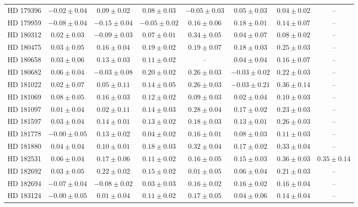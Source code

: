 \begin{table*}
\begin{tabular}{cccccccc}
HD 179396 & $-0.02 \pm 0.04$ & $0.09 \pm 0.02$ & $0.08 \pm 0.03$ & $-0.05 \pm 0.03$ & $0.05 \pm 0.03$ & $0.04 \pm 0.02$ & -- \\
HD 179959 & $-0.08 \pm 0.04$ & $-0.15 \pm 0.04$ & $-0.05 \pm 0.02$ & $0.16 \pm 0.06$ & $0.18 \pm 0.01$ & $0.14 \pm 0.07$ & -- \\
HD 180312 & $0.02 \pm 0.03$ & $-0.09 \pm 0.03$ & $0.07 \pm 0.01$ & $0.34 \pm 0.05$ & $0.04 \pm 0.07$ & $0.08 \pm 0.02$ & -- \\
HD 180475 & $0.03 \pm 0.05$ & $0.16 \pm 0.04$ & $0.19 \pm 0.02$ & $0.19 \pm 0.07$ & $0.18 \pm 0.03$ & $0.25 \pm 0.03$ & -- \\
HD 180658 & $0.03 \pm 0.06$ & $0.13 \pm 0.03$ & $0.11 \pm 0.02$ & -- & $0.04 \pm 0.04$ & $0.16 \pm 0.07$ & -- \\
HD 180682 & $0.06 \pm 0.04$ & $-0.03 \pm 0.08$ & $0.20 \pm 0.02$ & $0.26 \pm 0.03$ & $-0.03 \pm 0.02$ & $0.22 \pm 0.03$ & -- \\
HD 181022 & $0.02 \pm 0.07$ & $0.05 \pm 0.11$ & $0.14 \pm 0.05$ & $0.26 \pm 0.03$ & $-0.03 \pm 0.21$ & $0.36 \pm 0.14$ & -- \\
HD 181069 & $0.08 \pm 0.05$ & $0.16 \pm 0.03$ & $0.12 \pm 0.02$ & $0.09 \pm 0.03$ & $0.02 \pm 0.04$ & $0.10 \pm 0.03$ & -- \\
HD 181097 & $0.01 \pm 0.04$ & $0.02 \pm 0.11$ & $0.14 \pm 0.03$ & $0.28 \pm 0.04$ & $0.17 \pm 0.02$ & $0.23 \pm 0.03$ & -- \\
HD 181597 & $0.03 \pm 0.04$ & $0.14 \pm 0.01$ & $0.13 \pm 0.02$ & $0.18 \pm 0.03$ & $0.13 \pm 0.01$ & $0.26 \pm 0.03$ & -- \\
HD 181778 & $-0.00 \pm 0.05$ & $0.13 \pm 0.02$ & $0.04 \pm 0.02$ & $0.16 \pm 0.01$ & $0.08 \pm 0.03$ & $0.11 \pm 0.03$ & -- \\
HD 181880 & $0.04 \pm 0.04$ & $0.10 \pm 0.01$ & $0.18 \pm 0.03$ & $0.32 \pm 0.04$ & $0.17 \pm 0.02$ & $0.33 \pm 0.04$ & -- \\
HD 182531 & $0.06 \pm 0.04$ & $0.17 \pm 0.06$ & $0.11 \pm 0.02$ & $0.16 \pm 0.05$ & $0.15 \pm 0.03$ & $0.36 \pm 0.03$ & $0.35 \pm 0.14$ \\
HD 182692 & $0.03 \pm 0.05$ & $0.22 \pm 0.02$ & $0.15 \pm 0.02$ & $0.01 \pm 0.05$ & $0.06 \pm 0.04$ & $0.21 \pm 0.03$ & -- \\
HD 182694 & $-0.07 \pm 0.04$ & $-0.08 \pm 0.02$ & $0.03 \pm 0.03$ & $0.16 \pm 0.02$ & $0.16 \pm 0.02$ & $0.16 \pm 0.04$ & -- \\
HD 183124 & $-0.00 \pm 0.05$ & $0.01 \pm 0.04$ & $0.11 \pm 0.02$ & $0.17 \pm 0.05$ & $0.04 \pm 0.06$ & $0.14 \pm 0.04$ & -- \\

\end{tabular}
\end{table*}

